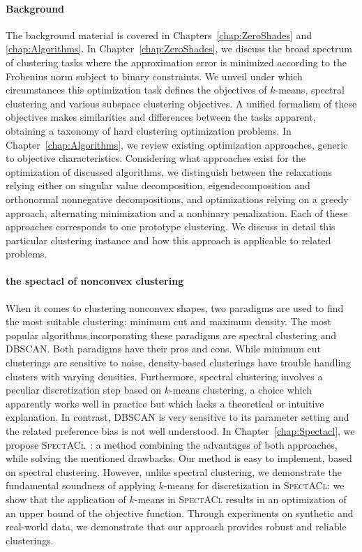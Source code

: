 \paragraph{Background} The background material is covered in Chapters~\ref{chap:ZeroShades} and \ref{chap:Algorithms}. In Chapter~\ref{chap:ZeroShades}, we discuss the broad spectrum of clustering tasks where the approximation error is minimized according to the Frobenius norm subject to binary constraints. We unveil under which circumstances this optimization task defines the objectives of $k$-means, spectral clustering and various subspace clustering objectives. A unified formalism of these objectives makes similarities and differences between the tasks apparent, obtaining a taxonomy of hard clustering optimization problems.
In Chapter~\ref{chap:Algorithms}, we review existing optimization approaches, generic to objective characteristics. Considering what approaches exist for the optimization of discussed algorithms, we distinguish between the relaxations relying either on singular value decomposition, eigendecomposition and orthonormal nonnegative decompositions, and optimizations relying on a greedy approach, alternating minimization and a nonbinary penalization.  Each of these approaches corresponds to one prototype clustering. We discuss in detail this particular clustering instance and how this approach is applicable to related problems.
\paragraph{the spectacl of nonconvex clustering} 
When it comes to clustering nonconvex shapes, two paradigms are used to find the most suitable clustering: minimum cut and maximum density. The most popular algorithms incorporating these paradigms are spectral clustering and DBSCAN. Both paradigms have their pros and cons. While minimum cut clusterings are sensitive to noise, density-based clusterings have trouble handling clusters with varying densities. Furthermore, spectral clustering involves a peculiar discretization step based on $k$-means clustering, a choice which apparently works well in practice but which lacks a theoretical or intuitive explanation. In contrast, DBSCAN is very sensitive to its parameter setting and the related preference bias is not well understood. In Chapter~\ref{chap:Spectacl}, we propose \textsc{SpectACl}~\citep{hess2019spectacl}: a method combining the advantages of both approaches, while solving the mentioned drawbacks. Our method is easy to implement, based on spectral clustering. However, unlike spectral clustering, we demonstrate the fundamental soundness of applying $k$-means for discretization in \textsc{SpectACl}: we show that the application of $k$-means in \textsc{SpectACl} results in an optimization of an upper bound of the objective function. Through experiments on synthetic and real-world data, we demonstrate that our approach provides robust and reliable clusterings. 
